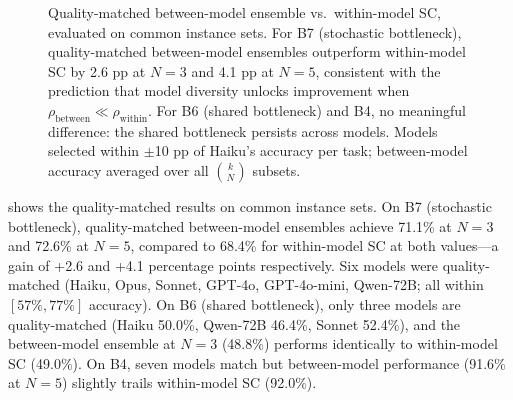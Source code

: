 \documentclass{article}
\theoremstyle{definition}
\theoremstyle{remark}
\begin{document}
\begin{figure}[t]
    \centering
    \caption{Quality-matched between-model ensemble vs.\ within-model SC, evaluated on common instance sets. For B7 (stochastic bottleneck), quality-matched between-model ensembles outperform within-model SC by 2.6 pp at $N = 3$ and 4.1 pp at $N = 5$, consistent with the prediction that model diversity unlocks improvement when $\rho_{\text{between}} \ll \rho_{\text{within}}$. For B6 (shared bottleneck) and B4, no meaningful difference: the shared bottleneck persists across models. Models selected within $\pm$10 pp of Haiku's accuracy per task; between-model accuracy averaged over all $\binom{k}{N}$ subsets.}
    \label{fig:ensemble}
\end{figure}

 shows the quality-matched results on common instance sets.
On B7 (stochastic bottleneck), quality-matched between-model ensembles achieve 71.1\% at $N = 3$ and 72.6\% at $N = 5$, compared to 68.4\% for within-model SC at both values---a gain of +2.6 and +4.1 percentage points respectively.
Six models were quality-matched (Haiku, Opus, Sonnet, GPT-4o, GPT-4o-mini, Qwen-72B; all within $[57\%, 77\%]$ accuracy).
On B6 (shared bottleneck), only three models are quality-matched (Haiku 50.0\%, Qwen-72B 46.4\%, Sonnet 52.4\%), and the between-model ensemble at $N = 3$ (48.8\%) performs identically to within-model SC (49.0\%).
On B4, seven models match but between-model performance (91.6\% at $N = 5$) slightly trails within-model SC (92.0\%).
\end{document}
